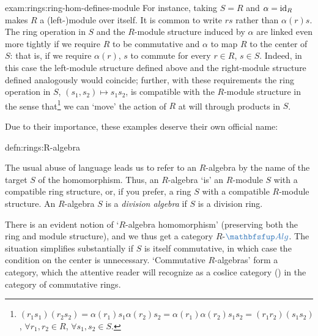 \begin{exam}{}{exam:rings:ring-hom-defines-module}
   For instance, taking $S = R$ and $\alpha = \operatorname{id}_R$
  makes $R$ a (left-)module over itself. It is common to write $rs$
  rather than $\alpha(r)s$.  The ring operation in $S$ and the
  $R$-module structure induced by $\alpha$ are linked even more
  tightly if we require $R$ to be commutative and $\alpha$ to map $R$
  to the center of $S$: that is, if we require $\alpha(r)$, $s$ to
  commute for every $r \in R$, $s \in S$. Indeed, in this case the
  left-module structure defined above and the right-module structure
  defined analogously would coincide; further, with these requirements
  the ring operation in $S$, $(s_1, s_2) \mapsto s_1 s_2$, is
  compatible with the $R$-module structure in the sense
  that\footnote{$(r_1 s_1)(r_2 s_2) = \alpha(r_1) s_1 \alpha(r_2) s_2
    = \alpha(r_1)\alpha(r_2) s_1 s_2 = (r_1 r_2)(s_1 s_2)$,
    $\forall r_1, r_2 \in R$, $\forall s_1, s_2 \in S$.} we can `move'
  the action of $R$ at will through products in $S$.
\end{exam}

Due to their importance, these examples deserve their own official
name:
\begin{defn}{}{defn:rings:R-algebra}
\end{defn}
The usual abuse of language leads us to refer to an $R$-algebra by the
name of the target $S$ of the homomorphism. Thus, an $R$-algebra `is'
an $R$-module $S$ with a compatible ring structure, or, if you prefer,
a ring $S$ with a compatible $R$-module structure. An $R$-algebra $S$
is a \emph{division algebra} if $S$ is a division ring.

There is an evident notion of `$R$-algebra homomorphism' (preserving
both the ring and module structure), and we thus get a category
$R$-$\categ{Alg}$. The situation simplifies substantially if $S$ is
itself commutative, in which case the condition on the center is
unnecessary. `Commutative $R$-algebras' form a category, which the
attentive reader will recognize as a coslice category
() in the category of commutative
rings.

